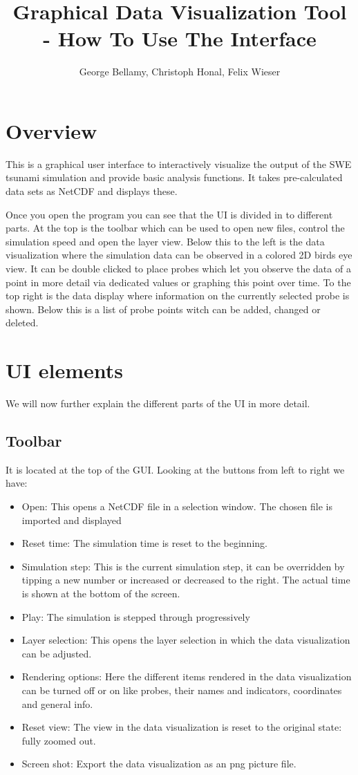 \documentclass[paper=a4]{proc}
\title{Graphical Data Visualization Tool - How To Use The Interface}
\author{George Bellamy, Christoph Honal, Felix Wieser}
\begin{document}
	\maketitle
	\thispagestyle{plain}	%
	\section{Overview}
		This is a graphical user interface to interactively visualize the output of the SWE tsunami simulation and provide basic analysis functions. It takes pre-calculated data sets as NetCDF and displays these. 
		
Once you open the program you can see that the UI is divided in to different parts. At the top is the toolbar which can be used to open new files, control the simulation speed and open the layer view. Below this to the left is the data visualization where the simulation data can be observed in a colored 2D birds eye view. It can be double clicked to place probes which let you observe the data of a point in more detail via dedicated values or graphing this point over time.
To the top right is the data display where information on the currently selected probe is shown. Below this is a list of probe points witch can be added, changed or deleted.
		
	\section{UI elements}
	We will now further explain the different parts of the UI in more detail. 
	
		\subsection{Toolbar}
		It is located at the top of the GUI. Looking at the buttons from left to right we have:
		\begin{itemize}
		\item Open: This opens a NetCDF file in a selection window. The chosen file is imported and displayed
		\item Reset time: The simulation time is reset to the beginning.
		\item Simulation step: This is the current simulation step, it can be overridden by tipping a new number or increased or decreased to the right. The actual time is shown at the bottom of the screen.
		\item Play: The simulation is stepped through progressively
		\item Layer selection: This opens the layer selection in which the data visualization can be adjusted.
		\item Rendering options: Here the different items rendered in the data visualization can be turned off or on like probes, their names and indicators, coordinates and general info.
		\item Reset view: The view in the data visualization is reset to the original state: fully zoomed out.
		\item Screen shot: Export the data visualization as an png picture file.
		
		\end{itemize}
		
\end{document}
